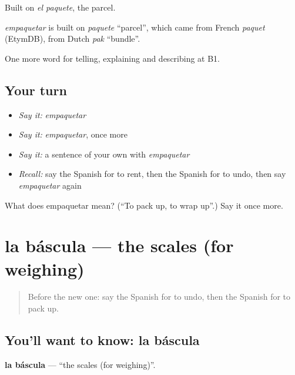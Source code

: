 Built on \emph{el paquete}, the parcel.

\begin{cousinweb}
\emph{empaquetar} is built on \emph{paquete} \textquotedblleft{}parcel\textquotedblright{}, which came from French \emph{paquet} (EtymDB), from Dutch \emph{pak} \textquotedblleft{}bundle\textquotedblright{}.
\end{cousinweb}

\begin{grammarlens}[title={What you've built}]
One more word for telling, explaining and describing at B1.
\end{grammarlens}

\subsection*{Your turn}
\begin{itemize}
\raggedright
  \item \emph{Say it:} \emph{empaquetar}
  \item \emph{Say it:} \emph{empaquetar}, once more
  \item \emph{Say it:} a sentence of your own with \emph{empaquetar}
  \item \emph{Recall:} say the Spanish for to rent, then the Spanish for to undo, then say \emph{empaquetar} again
\end{itemize}

\begin{tcolorbox}[breakable,colback=teal!4,colframe=teal!35!black,title={Before you move on}]
What does empaquetar mean? (\textquotedblleft{}To pack up, to wrap up\textquotedblright{}.) Say it once more.
\end{tcolorbox}
\section[la báscula]{la báscula — the scales (for weighing)}

\label{lesson:ES-C668-bascula}



\begin{quote}
Before the new one: say the Spanish for to undo, then the Spanish for to pack up.
\end{quote}

\subsection*{You'll want to know: la báscula}
\textbf{la báscula} — \textquotedblleft{}the scales (for weighing)\textquotedblright{}.

